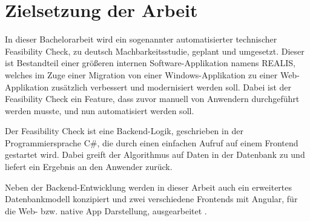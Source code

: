 \section{Zielsetzung der Arbeit}
In dieser Bachelorarbeit wird ein sogenannter automatisierter technischer Feasibility Check, zu deutsch Machbarkeitsstudie, geplant und umgesetzt. Dieser ist Bestandteil einer größeren internen Software-Applikation namens \gls{REALIS}, welches
im Zuge einer Migration  von einer Windows-Applikation zu einer Web-Applikation zusätzlich verbessert und modernisiert werden soll. Dabei ist der Feasibility Check ein Feature, dass zuvor manuell von Anwendern durchgeführt werden musste, und nun automatisiert werden soll.

Der Feasibility Check ist eine Backend-Logik, geschrieben in der Programmiersprache C\#, die durch einen einfachen Aufruf auf einem Frontend gestartet wird. Dabei greift der Algorithmus auf Daten in der Datenbank zu und liefert ein Ergebnis an den Anwender zurück.

Neben der Backend-Entwicklung werden in dieser Arbeit auch ein erweitertes Datenbankmodell konzipiert und zwei verschiedene Frontends mit Angular, für die Web- bzw. native App Darstellung, ausgearbeitet .